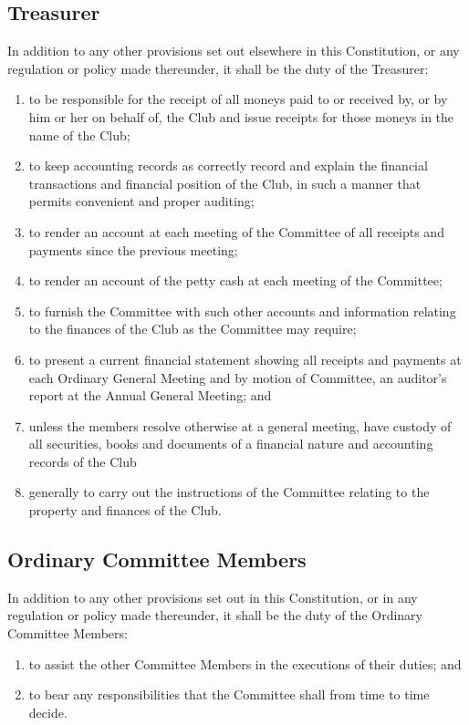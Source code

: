 \documentclass[11pt]{article} %
\begin{document}
\subsection{Treasurer}
In addition to any other provisions set out elsewhere in this Constitution, or any regulation or policy made thereunder, it shall be the duty of the Treasurer:
\begin{enumerate}
	\item to be responsible for the receipt of all moneys paid to or received by, or by him or her on behalf of, the Club and issue receipts for those moneys in the name of the Club;
	\item to keep accounting records as correctly record and explain the financial transactions and financial position of the Club, in such a manner that permits convenient and proper auditing;
	\item to render an account at each meeting of the Committee of all receipts and payments since the previous meeting;
	\item to render an account of the petty cash at each meeting of the Committee;
	\item to furnish the Committee with such other accounts and information relating to the finances of the Club as the Committee may require;
	\item to present a current financial statement showing all receipts and payments at each Ordinary General Meeting and by motion of Committee, an auditor's report at the Annual General Meeting; and
	\item unless the members resolve otherwise at a general meeting, have custody of all securities, books and documents of a financial nature and accounting records of the Club
	\item generally to carry out the instructions of the Committee relating to the property and finances of the Club.
\end{enumerate}

\subsection{Ordinary Committee Members}
In addition to any other provisions set out in this Constitution, or in any regulation or policy made thereunder, it shall be the duty of the Ordinary Committee Members:
\begin{enumerate}
	\item to assist the other Committee Members in the executions of their duties; and
	\item to bear any responsibilities that the Committee shall from time to time decide.
\end{enumerate}
\end{document}
